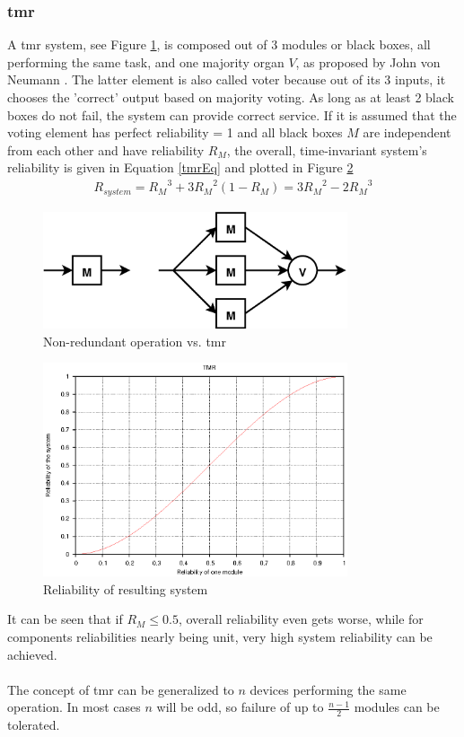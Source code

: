 \subsubsection{\gls{tmr}}
A \gls{tmr} system, see Figure \ref{fig:tmr}, is composed out of 3 modules or black boxes, all performing the same task,	
and one majority organ $V$, as proposed by John von Neumann \cite{vN56}. The latter element
is also called voter because out of its 3 inputs, it chooses the 'correct' output based on majority voting. As long as at least 2 black boxes do not
fail, the system can provide correct service. If it is assumed that the voting element has perfect reliability = 1 and all black boxes $M$ are independent from
each other and have reliability $R_M$, the overall, time-invariant system's reliability is given in Equation \ref{tmrEq} \cite{Lyons:1962:UTR:1661979.1661984} and plotted in Figure \ref{fig:tmrGrp}
\begin{align}\label{tmrEq}
 R_{system} = {R_M}^3 + 3{R_M}^2(1-R_M) = 3{R_M}^2 - 2{R_M}^3
\end{align}
\begin{figure}
    \centering
    \includegraphics[width=0.8\textwidth]{figures/tmr.eps}
    \caption{Non-redundant operation vs. \gls{tmr}}
    \label{fig:tmr}
\end{figure}
\begin{figure}
    \centering
    \includegraphics[width=0.8\textwidth]{figures/tmrGraph2.eps}
    \caption{Reliability of resulting system}
    \label{fig:tmrGrp}
\end{figure}
It can be seen that if $R_M \leq 0.5$, overall reliability even gets worse, while for components reliabilities nearly being unit, very high system reliability can
be achieved.
\\
\\
The concept of \gls{tmr} can be generalized to $n$ devices performing
the same operation. In most cases $n$ will be odd, so failure of up to $\frac{n-1}{2}$ modules can be tolerated.

